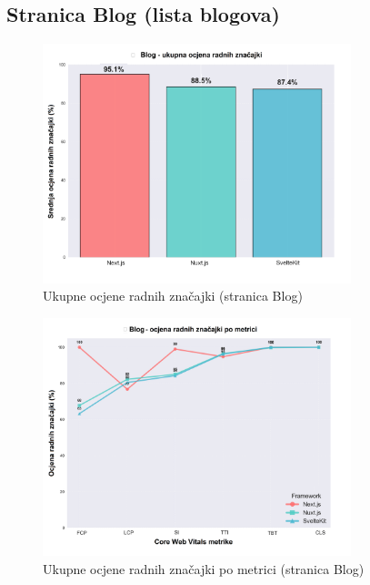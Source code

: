 
\subsection{Stranica Blog (lista blogova)}

\begin{figure}[H]
    \centering
    \includegraphics[width=0.8\textwidth]{slike/rezultati/blog/blog_framework_overall_performance.png}
    \caption{Ukupne ocjene radnih značajki (stranica Blog)}
    \label{fig:testiranje-blog-ukupne-performanse}
\end{figure}

\begin{figure}[H]
    \centering
    \includegraphics[width=0.8\textwidth]{slike/rezultati/blog/blog_performance_by_metric.png}
    \caption{Ukupne ocjene radnih značajki po metrici (stranica Blog)}
    \label{fig:testiranje-blog-performanse-po-metrici}
\end{figure}

